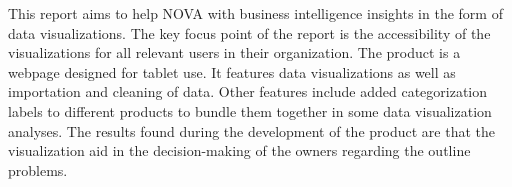 This report aims to help NOVA with business intelligence insights in the form of data visualizations.
The key focus point of the report is the accessibility of the visualizations for all relevant users in their
organization.
The product is a webpage designed for tablet use.
It features data visualizations as well as importation and cleaning of data.
Other features include added categorization labels to different products to bundle them together in some data
visualization analyses.
The results found during the development of the product are that the visualization aid in the decision-making of the
owners regarding the outline problems.
